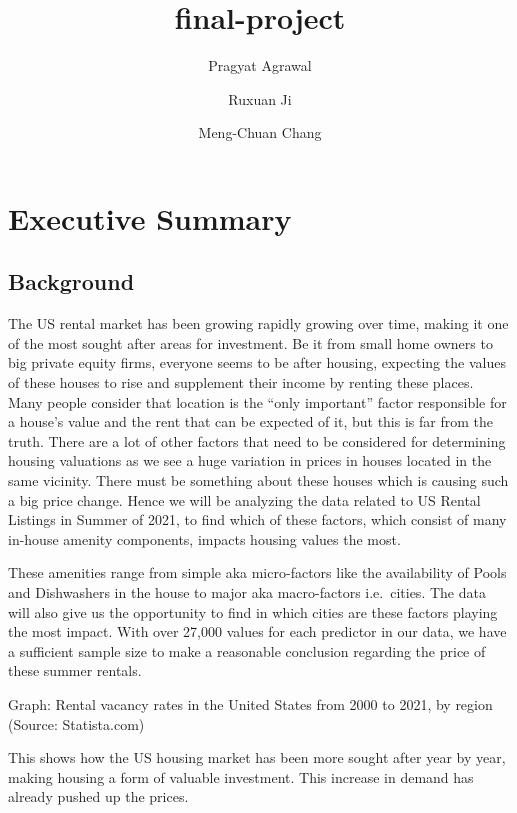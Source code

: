 \documentclass[
]{article}
\title{final-project}
\author{Pragyat Agrawal \and Ruxuan Ji \and Meng-Chuan Chang}
\date{}
\begin{document}
\maketitle

{
\setcounter{tocdepth}{3}
\tableofcontents
}
\hypertarget{executive-summary}{%
\section{Executive Summary}\label{executive-summary}}

\hypertarget{background}{%
\subsection{Background}\label{background}}

The US rental market has been growing rapidly growing over time, making
it one of the most sought after areas for investment. Be it from small
home owners to big private equity firms, everyone seems to be after
housing, expecting the values of these houses to rise and supplement
their income by renting these places. Many people consider that location
is the ``only important'' factor responsible for a house's value and the
rent that can be expected of it, but this is far from the truth. There
are a lot of other factors that need to be considered for determining
housing valuations as we see a huge variation in prices in houses
located in the same vicinity. There must be something about these houses
which is causing such a big price change. Hence we will be analyzing the
data related to US Rental Listings in Summer of 2021, to find which of
these factors, which consist of many in-house amenity components,
impacts housing values the most.

These amenities range from simple aka micro-factors like the
availability of Pools and Dishwashers in the house to major aka
macro-factors i.e.~cities. The data will also give us the opportunity to
find in which cities are these factors playing the most impact. With
over 27,000 values for each predictor in our data, we have a sufficient
sample size to make a reasonable conclusion regarding the price of these
summer rentals.

Graph: Rental vacancy rates in the United States from 2000 to 2021, by
region (Source: Statista.com)

This shows how the US housing market has been more sought after year by
year, making housing a form of valuable investment. This increase in
demand has already pushed up the prices.
\end{document}
